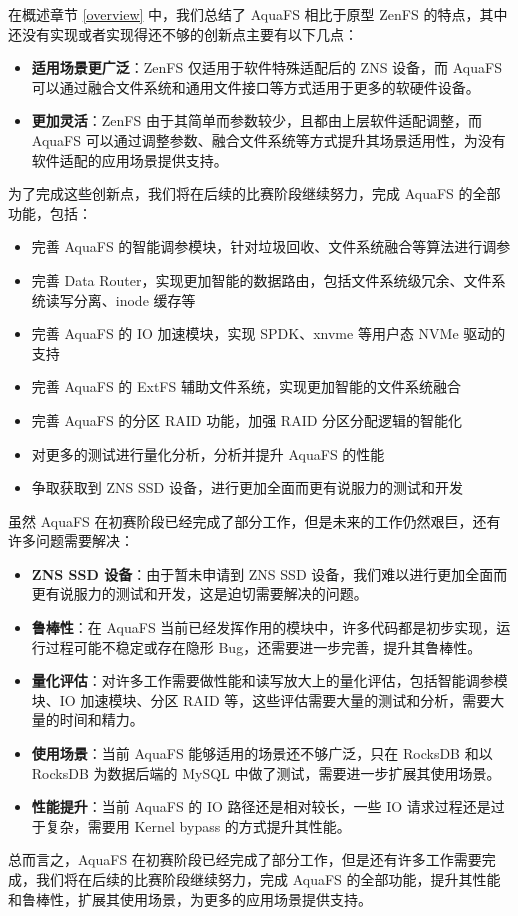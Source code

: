 在概述章节 \ref{overview} 中，我们总结了 AquaFS 相比于原型 ZenFS 的特点，其中还没有实现或者实现得还不够的创新点主要有以下几点：

\begin{itemize}
  \item \textbf{适用场景更广泛}：ZenFS 仅适用于软件特殊适配后的 ZNS 设备，而 AquaFS 可以通过融合文件系统和通用文件接口等方式适用于更多的软硬件设备。
  \item \textbf{更加灵活}：ZenFS 由于其简单而参数较少，且都由上层软件适配调整，而 AquaFS 可以通过调整参数、融合文件系统等方式提升其场景适用性，为没有软件适配的应用场景提供支持。
\end{itemize}

为了完成这些创新点，我们将在后续的比赛阶段继续努力，完成 AquaFS 的全部功能，包括：

\begin{itemize}
  \item 完善 AquaFS 的智能调参模块，针对垃圾回收、文件系统融合等算法进行调参
  \item 完善 Data Router，实现更加智能的数据路由，包括文件系统级冗余、文件系统读写分离、inode 缓存等
  \item 完善 AquaFS 的 IO 加速模块，实现 SPDK、xnvme 等用户态 NVMe 驱动的支持
  \item 完善 AquaFS 的 ExtFS 辅助文件系统，实现更加智能的文件系统融合
  \item 完善 AquaFS 的分区 RAID 功能，加强 RAID 分区分配逻辑的智能化
  \item 对更多的测试进行量化分析，分析并提升 AquaFS 的性能
  \item 争取获取到 ZNS SSD 设备，进行更加全面而更有说服力的测试和开发
\end{itemize}

虽然 AquaFS 在初赛阶段已经完成了部分工作，但是未来的工作仍然艰巨，还有许多问题需要解决：

\begin{itemize}
  \item \textbf{ZNS SSD 设备}：由于暂未申请到 ZNS SSD 设备，我们难以进行更加全面而更有说服力的测试和开发，这是迫切需要解决的问题。
  \item \textbf{鲁棒性}：在 AquaFS 当前已经发挥作用的模块中，许多代码都是初步实现，运行过程可能不稳定或存在隐形 Bug，还需要进一步完善，提升其鲁棒性。
  \item \textbf{量化评估}：对许多工作需要做性能和读写放大上的量化评估，包括智能调参模块、IO 加速模块、分区 RAID 等，这些评估需要大量的测试和分析，需要大量的时间和精力。
  \item \textbf{使用场景}：当前 AquaFS 能够适用的场景还不够广泛，只在 RocksDB 和以 RocksDB 为数据后端的 MySQL 中做了测试，需要进一步扩展其使用场景。
  \item \textbf{性能提升}：当前 AquaFS 的 IO 路径还是相对较长，一些 IO 请求过程还是过于复杂，需要用 Kernel bypass 的方式提升其性能。
\end{itemize}

总而言之，AquaFS 在初赛阶段已经完成了部分工作，但是还有许多工作需要完成，我们将在后续的比赛阶段继续努力，完成 AquaFS 的全部功能，提升其性能和鲁棒性，扩展其使用场景，为更多的应用场景提供支持。

